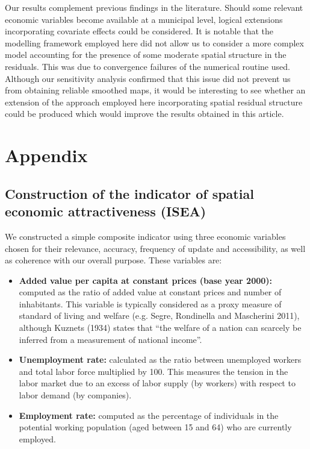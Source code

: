 Our results complement previous findings in the literature. Should some relevant economic variables become available at a municipal level, logical extensions incorporating covariate effects could be considered. It is notable that the modelling framework employed here did not allow us to consider a more complex model accounting for the presence of some moderate spatial structure in the residuals. This was due to convergence failures of the numerical routine used. Although our sensitivity analysis confirmed that this issue did not prevent us from obtaining reliable smoothed maps, it would be interesting to see whether an extension of the approach employed here incorporating spatial residual structure could be produced which would improve the results obtained in this article.


\section*{Appendix \label{NEX}}

\subsection*{Construction of the indicator of spatial economic attractiveness (ISEA) \label{ISEA}}

We constructed a simple composite indicator using three economic variables chosen for their relevance, accuracy, frequency of update and accessibility, as well as coherence with our overall purpose. These variables are:

\begin{itemize}
\item \textbf{Added value per capita at constant prices (base year 2000):} computed as the ratio of added value at constant prices and number of inhabitants. This variable is typically considered as a proxy measure of standard of living and welfare (e.g. Segre, Rondinella and Mascherini 2011), although Kuznets (1934) states that ``the welfare of a nation can scarcely be inferred from a measurement of national income''. 

\item \textbf{Unemployment rate:} calculated as the ratio between unemployed workers and total labor force multiplied by 100. This measures the tension in the labor market due to an excess of labor supply (by workers) with respect to labor demand (by companies).

\item \textbf{Employment rate:} computed as the percentage of individuals in the potential working population (aged between 15 and 64) who are currently employed.
\end{itemize}

